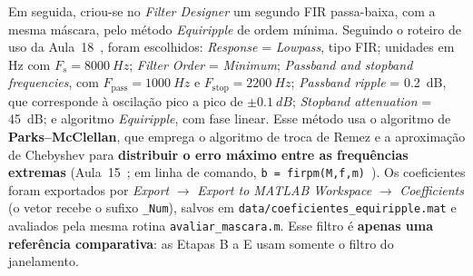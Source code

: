 \documentclass[11pt,a4paper]{article}
\begin{document}
Em seguida, criou-se no \textit{Filter Designer} um segundo FIR passa-baixa, com a mesma máscara, pelo método \textit{Equiripple} de ordem mínima. Seguindo o roteiro de uso da Aula~18~\cite{aula18}, foram escolhidos: \textit{Response} = \textit{Lowpass}, tipo FIR; unidades em \si{Hz} com $F_s = \SI{8000}{Hz}$; \textit{Filter Order} = \textit{Minimum}; \textit{Passband and stopband frequencies}, com $F_{\text{pass}} = \SI{1000}{Hz}$ e $F_{\text{stop}} = \SI{2200}{Hz}$; \textit{Passband ripple} = \SI{0,2}{dB}, que corresponde à oscilação pico a pico de $\pm\SI{0,1}{dB}$; \textit{Stopband attenuation} = \SI{45}{dB}; e algoritmo \textit{Equiripple}, com fase linear. Esse método usa o algoritmo de \textbf{Parks--McClellan}, que emprega o algoritmo de troca de Remez e a aproximação de Chebyshev para \textbf{distribuir o erro máximo entre as frequências extremas} (Aula~15~\cite{aula15}; em linha de comando, \texttt{b = firpm(M,f,m)}~\cite{mathworks2026}). Os coeficientes foram exportados por \textit{Export} $\to$ \textit{Export to MATLAB Workspace} $\to$ \textit{Coefficients} (o vetor recebe o sufixo \texttt{\_Num}), salvos em \texttt{data/coeficientes\_equiripple.mat} e avaliados pela mesma rotina \texttt{avaliar\_mascara.m}. Esse filtro é \textbf{apenas uma referência comparativa}: as Etapas B a E usam somente o filtro do janelamento.
\end{document}
